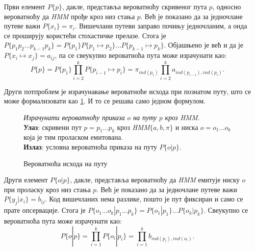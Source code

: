\documentclass[12pt,oneside]{memoir}
\newenvironment{problem}[1][!ht]
{\renewcommand{\algorithmcfname}{Проблем}
\begin{figure}[!ht]
\centering
  \begin{minipage}{.94\linewidth}
	\begin{algorithm}[#1]%
  }{\end{algorithm}
  \end{minipage}
\end{figure}}
\begin{document}
\begin{CJK}{UTF8}{ipxm}
Први елемент $P\{p\}$, дакле, представља вероватноћу скривеног пута $p$, односно вероватноћу да \textit{HMM} прође кроз низ стања $p$. Већ је показано да за једночлане путеве важи $P\{x_i\} = \pi_i$. Вишечлани путеви заправо почињу једночланим, а онда се проширују користећи стохастичке прелазе. Стога је $P\{p_1p_2...p_{k-1}p_k\} = P\{p_1\}P\{p_1 \mapsto p_2\}...P\{p_{k-1} \mapsto p_k\}$. Објашњено је већ и да је $P\{x_i \mapsto x_j\} = a_{ij}$, па се свеукупно вероватноћа пута може израчунати као: $$P\{p\} = P\{p_1\} \prod_{i=2}^k P\{p_{i-1} \mapsto p_i\} = \pi_{ind(p_1)} \prod_{i=2}^k a_{ind(p_{i-1}), ind(p_i)}.$$

Други потпроблем је израчунавање вероватноће исхода при познатом путу, што се може формализовати као \ref{prob:ishod}. И то се решава само једном формулом.

\begin{problem}[H]
  \SetAlgoLined
  \textit{Израчунати вероватноћу приказа $o$ на путу $p$ кроз \textit{HMM}.}\\
  \textbf{Улаз}: скривени пут $p = p_1...p_k$ кроз \textit{HMM}$\{a, b, \pi\}$ и ниска $o = o_1...o_k$ која је тим проласком емитована.\\
  \textbf{Излаз}: условна вероватноћа приказа на путу $P\{o | p\}$.
  \caption{Вероватноћа исхода на путу \cite{ba10b}}
  \label{prob:ishod}
\end{problem}

Други елемент $P\{o | p\}$, дакле, представља вероватноћу да \textit{HMM} емитује ниску $o$ при проласку кроз низ стања $p$. Већ је показано да за једночлане путеве важи $P\{y_j | x_i\} = b_{ij}$. Код вишечланих нема разлике, пошто је пут фиксиран и само се прате опсервације. Стога је $P\{o_1...o_k | p_1...p_k\} = P\{o_1 | p_1\}...P\{o_k | p_k\}$. Свеукупно се вероватноћа пута може израчунати као: $$P\{o | p\} = \prod_{i=1}^k P\{o_i | p_i\} = \prod_{i=1}^k b_{ind(p_i), ind(o_i)}.$$


\end{CJK}
\end{document}
